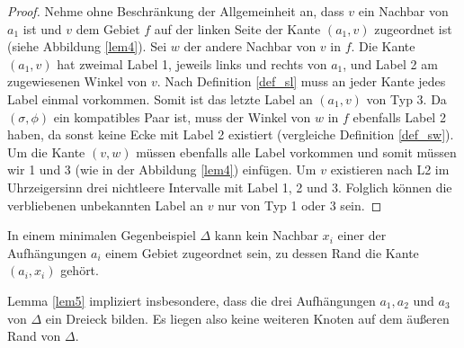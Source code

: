 \begin{proof}
Nehme ohne Beschränkung der Allgemeinheit an, dass $v$ ein Nachbar von $a_1$ ist und $v$ dem Gebiet $f$ auf der linken Seite der Kante $(a_1,v)$ zugeordnet ist (siehe Abbildung \ref{lem4}). Sei $w$ der andere Nachbar von $v$ in $f$. Die Kante $(a_1,v)$ hat zweimal Label 1, jeweils links und rechts von $a_1$, und Label 2 am zugewiesenen Winkel von $v$. Nach Definition \ref{def_sl} muss an jeder Kante jedes Label einmal vorkommen. Somit ist das letzte Label an $(a_1,v)$ von Typ 3. Da $(\sigma,\phi)$ ein kompatibles Paar ist, muss der Winkel von $w$ in $f$ ebenfalls Label 2 haben, da sonst keine Ecke mit Label 2 existiert (vergleiche Definition \ref{def_sw}). Um die Kante $(v,w)$ müssen ebenfalls alle Label vorkommen und somit müssen wir 1 und 3 (wie in der Abbildung \ref{lem4}) einfügen. Um $v$ existieren nach L2 im Uhrzeigersinn drei nichtleere Intervalle mit Label 1, 2 und 3. Folglich können die verbliebenen unbekannten Label an $v$ nur von Typ 1 oder 3 sein.
\end{proof}

\begin{lemma}\label{lem5}
In einem minimalen Gegenbeispiel $\Delta$ kann kein Nachbar $x_i$ einer der Aufhängungen $a_i$ einem Gebiet zugeordnet sein, zu dessen Rand die Kante $(a_i,x_i)$ gehört.
\end{lemma}

\begin{remark}
Lemma \ref{lem5} impliziert insbesondere, dass die drei Aufhängungen $a_1,a_2$ und $a_3$ von $\Delta$ ein Dreieck bilden. Es liegen also keine weiteren Knoten auf dem äußeren Rand von $\Delta$.
\end{remark}

